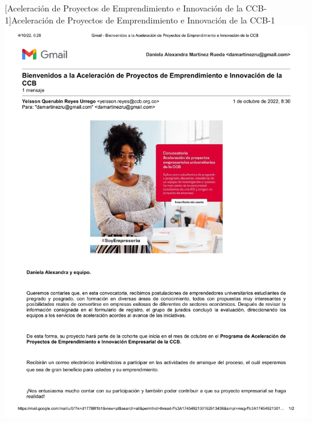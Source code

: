 \vspace{2mm}
        \begin{minipage}{0.9\textwidth}
        \centering
        [{Aceleración de Proyectos de Emprendimiento e Innovación de la CCB-1}]{Aceleración de Proyectos de Emprendimiento e Innovación de la CCB-1 }
        \label{convocatoria1}
         \includegraphics[width=1\textwidth]{Images/Gmail - Bienvenidos a la Aceleración de Proyectos de Emprendimiento e Innovación de la CCB-1.png}
\end{minipage}

